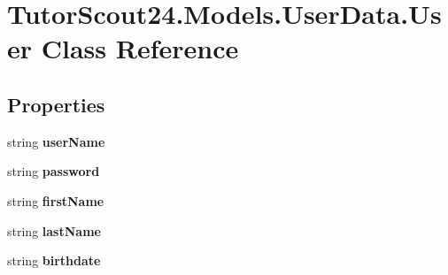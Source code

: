 \hypertarget{class_tutor_scout24_1_1_models_1_1_user_data_1_1_user}{}\section{Tutor\+Scout24.\+Models.\+User\+Data.\+User Class Reference}
\label{class_tutor_scout24_1_1_models_1_1_user_data_1_1_user}
\subsection*{Properties}
\begin{DoxyCompactItemize}
\item 
\mbox{\label{class_tutor_scout24_1_1_models_1_1_user_data_1_1_user_a79d81da90b30f41b203700ddc5207323}} 
string {\bfseries user\+Name}
\item 
\mbox{\label{class_tutor_scout24_1_1_models_1_1_user_data_1_1_user_aa2012dfe8e82b171f3540ead6e4d5629}} 
string {\bfseries password}
\item 
\mbox{\label{class_tutor_scout24_1_1_models_1_1_user_data_1_1_user_ab0436d3750be65ae9292ea784142b512}} 
string {\bfseries first\+Name}
\item 
\mbox{\label{class_tutor_scout24_1_1_models_1_1_user_data_1_1_user_a2302f508680a97905c11a9eea9ce4f95}} 
string {\bfseries last\+Name}
\item 
\mbox{\label{class_tutor_scout24_1_1_models_1_1_user_data_1_1_user_a7824cec44e8d4b5afe76f0948f0524ea}} 
string {\bfseries birthdate}
\item 

\end{DoxyCompactItemize}

